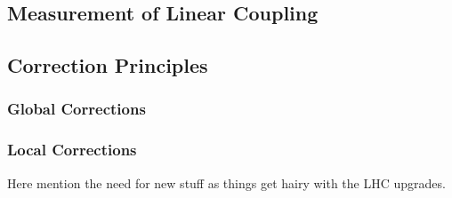 \cite{PRAB:Miyamoto:Parametrization_Driven_Betatron_Oscillation}
\cite{PRAB:Tomas:Adiabaticity_Ramping_Process_AC_Dipole}

\subsection{Measurement of Linear Coupling}

\cite{PRAB:Tomas:CERN_LHC_OMC}

\subsection{Correction Principles}

\subsubsection{Global Corrections}

\subsubsection{Local Corrections}

Here mention the need for new stuff as things get hairy with the LHC upgrades.